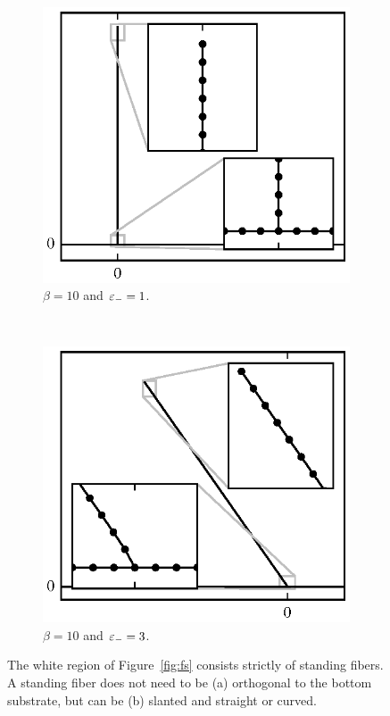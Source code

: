 	\begin{figure}[t!]
		\centering
		\begin{subfigure}{.5\textwidth}
			\centering
			\includegraphics{./fig/ch3/fs/b10_eb1.eps}
			\caption{$\beta=10$ and $\varepsilon_-=1$.\label{subfig:erect}}
		\end{subfigure}%
		~
		\begin{subfigure}{.5\textwidth}
			\centering
			\includegraphics{./fig/ch3/fs/b10_eb3.eps}
			\caption{$\beta=10$ and $\varepsilon_-=3$.\label{subfig:leaning}}
		\end{subfigure}
		\caption{The white region of Figure~\ref{fig:fs} consists strictly of standing fibers. A standing fiber does not need to be (a) orthogonal to the bottom substrate, but can be (b) slanted and straight or curved.\label{fig:alert}}
	\end{figure}

